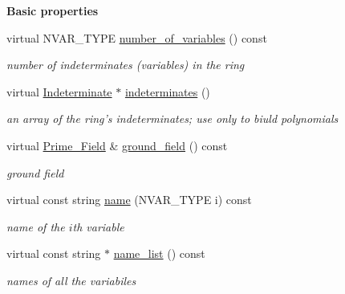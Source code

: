 \begin{Indent}\textbf{ Basic properties}\par
\begin{DoxyCompactItemize}
\item 
\mbox{\label{class_polynomial___ring_a79e7dd821659e9d4b6862487963f7352}} 
virtual N\+V\+A\+R\+\_\+\+T\+Y\+PE \hyperlink{class_polynomial___ring_a79e7dd821659e9d4b6862487963f7352}{number\+\_\+of\+\_\+variables} () const
\begin{DoxyCompactList}\small\item\em number of indeterminates (variables) in the ring \end{DoxyCompactList}\item 
\mbox{\label{class_polynomial___ring_afea6c3a4fd9f3f04f312579a94a3cc1b}} 
virtual \hyperlink{class_indeterminate}{Indeterminate} $\ast$ \hyperlink{class_polynomial___ring_afea6c3a4fd9f3f04f312579a94a3cc1b}{indeterminates} ()
\begin{DoxyCompactList}\small\item\em an array of the ring's indeterminates; use only to biuld polynomials \end{DoxyCompactList}\item 
\mbox{\label{class_polynomial___ring_a643bd55dbe8686b2dd1341503a67aace}} 
virtual \hyperlink{class_prime___field}{Prime\+\_\+\+Field} \& \hyperlink{class_polynomial___ring_a643bd55dbe8686b2dd1341503a67aace}{ground\+\_\+field} () const
\begin{DoxyCompactList}\small\item\em ground field \end{DoxyCompactList}\item 
\mbox{\label{class_polynomial___ring_a657caa3e9c277ca34d20cb69eed7fe05}} 
virtual const string \hyperlink{class_polynomial___ring_a657caa3e9c277ca34d20cb69eed7fe05}{name} (N\+V\+A\+R\+\_\+\+T\+Y\+PE i) const
\begin{DoxyCompactList}\small\item\em name of the $i$th variable \end{DoxyCompactList}\item 
\mbox{\label{class_polynomial___ring_aef9c6745956393863080422ddb8da48c}} 
virtual const string $\ast$ \hyperlink{class_polynomial___ring_aef9c6745956393863080422ddb8da48c}{name\+\_\+list} () const
\begin{DoxyCompactList}\small\item\em names of all the variabiles \end{DoxyCompactList}\end{DoxyCompactItemize}
\end{Indent}
